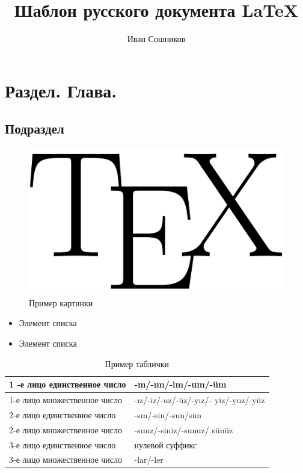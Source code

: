 \documentclass[11pt, a4paper]{article}
\title{Шаблон русского документа \LaTeX}
\author{Иван Сошников}
\begin{document}
\maketitle

\tableofcontents

\listoftodos

\pagebreak

\section{Раздел. Глава.}


\subsection{Подраздел}

\begin{figure}[h]
\centering
\includegraphics[scale=.2]{tex_logo}
\caption{Пример картинки}
\end{figure}

\begin{itemize}
	\setlength\itemsep{-.6em}
	\item Элемент списка
	\item Элемент списка
\end{itemize}

\begin{table}[h]
	\centering
	\begin{tabular}{|l|l|}
	\hline
	1 -е лицо единственное число & -m/-ım/-im/-um/-üm \\ \hline
	1-е лицо множественное число & -ız/-iz/-uz/-üz/-yız/- yiz/-yuz/-yüz \\ \hline
	2-е лицо единственное число & -sın/-sin/-sun/sün \\ \hline
	2-е лицо множественное число & -sınız/-siniz/-sunuz/ sünüz \\ \hline
	3-е лицо единственное число & нулевой суффикс \\ \hline
	3-е лицо множественное число & -lar/-ler \\ \hline
	\end{tabular}
	\caption{Пример таблички}
\end{table}
\end{document}
